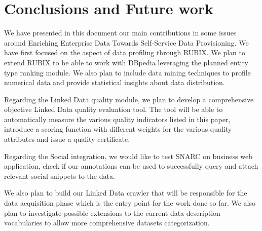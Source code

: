 \documentclass[onecolumn, crcready]{iosart2c}
\begin{document}

\section{Conclusions and Future work}

We have presented in this document our main contributions in some issues around Enriching Enterprise Data Towards Self-Service Data Provisioning. We have first focused on the aspect of data profiling through RUBIX. We plan to extend RUBIX to be able to work with DBpedia leveraging the planned entity type ranking module. We also plan to include data mining techniques to profile numerical data and provide statistical insights about data distribution. 

Regarding the Linked Data quality module, we plan to develop a comprehensive objective Linked Data quality evaluation tool. The tool will be able to automatically measure the various quality indicators listed in this paper, introduce a scoring function with different weights for the various quality attributes and issue a quality certificate.

Regarding the Social integration, we would like to test SNARC on business web application, check if our annotations can be used to successfully query and attach relevant social snippets to the data.

We also plan to build our Linked Data crawler that will be responsible for the data acquisition phase which is the entry point for the work done so far. We also plan to investigate possible extensions to the current data description vocabularies to allow more comprehensive datasets categorization. 


\nocite{*}


\end{document}
